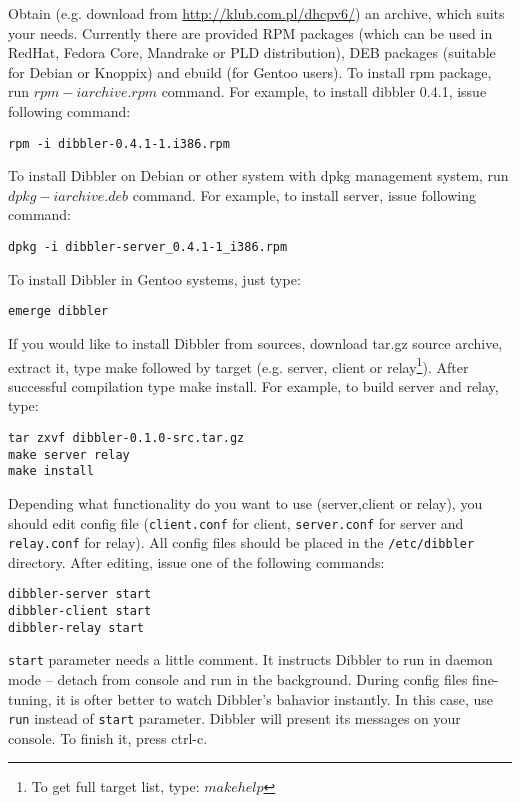 Obtain (e.g. download from \url{http://klub.com.pl/dhcpv6/}) an
archive, which suits your needs. Currently there are provided RPM packages
(which can be used in RedHat, Fedora Core, Mandrake or PLD
distribution), DEB packages (suitable for Debian or Knoppix) and
ebuild (for Gentoo users). To install rpm package, run $rpm -i
archive.rpm$ command. For example, to install dibbler 0.4.1, issue following command:
\begin{verbatim}
rpm -i dibbler-0.4.1-1.i386.rpm 
\end{verbatim}

To install Dibbler on Debian or other system with dpkg management
system, run $dpkg -i archive.deb$ command. For example, to install
server, issue following command:

\begin{verbatim}
dpkg -i dibbler-server_0.4.1-1_i386.rpm 
\end{verbatim}

To install Dibbler in Gentoo systems, just type:

\begin{verbatim}
emerge dibbler
\end{verbatim}

If you would like to install Dibbler from sources, download tar.gz
source archive, extract it, type make followed by target (e.g. server,
client or relay\footnote{To get full target list, type: $make
  help$}). After successful compilation type make install. For
example, to build server and relay, type:

\begin{verbatim}
tar zxvf dibbler-0.1.0-src.tar.gz
make server relay
make install
\end{verbatim}

Depending what functionality do you want to use (server,client or relay),
you should edit config file (\verb+client.conf+ for client, \verb+server.conf+
for server and \verb+relay.conf+ for relay). All config files should
be placed in the \verb+/etc/dibbler+ directory. After editing, issue one of
the following commands:

\begin{verbatim}
dibbler-server start
dibbler-client start
dibbler-relay start
\end{verbatim}

\verb+start+ parameter needs a little comment. It
instructs Dibbler to run in daemon mode -- detach from console and run
in the background. During config files fine-tuning, it is ofter better
to watch Dibbler's bahavior instantly. In this case, use \verb+run+
instead of \verb+start+ parameter. Dibbler will present its messages on
your console. To finish it, press ctrl-c.

